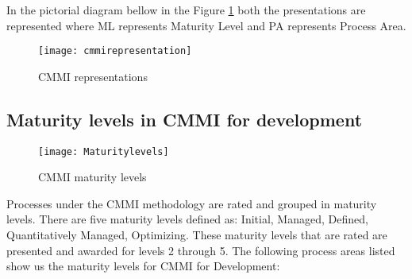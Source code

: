 In the pictorial diagram bellow in the Figure \ref{fig:cmmirepresentation} both the presentations are represented where ML represents Maturity Level and PA represents Process Area.

\begin{figure}[h]
	\begin{center}
		\leavevmode
		\texttt{[image: cmmirepresentation]}
		\caption{CMMI representations}
		\label{fig:cmmirepresentation}
	\end{center}
\end{figure}

\subsection{Maturity levels in CMMI for development}
\begin{figure}[h]
	\begin{center}
		\leavevmode
		\texttt{[image: Maturitylevels]}
		\caption{CMMI maturity levels}
		\label{fig:maturitylevels}
	\end{center}
\end{figure}
Processes under the CMMI methodology are rated and grouped in maturity levels. There are five  maturity levels defined as: Initial, Managed, Defined, Quantitatively Managed, Optimizing. These maturity levels that are rated are presented and awarded for levels 2 through 5. The following process areas listed show us the maturity levels for CMMI for Development:


